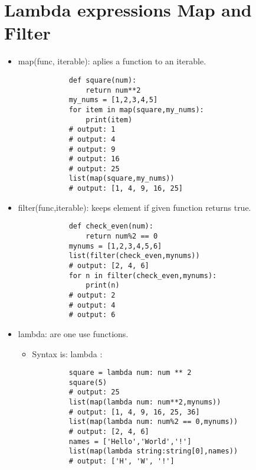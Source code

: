 \section{Lambda expressions Map and Filter}
\begin{itemize}
    \item map(func, iterable): aplies a function to an iterable.
        \begin{verbatim}
            def square(num):
                return num**2
            my_nums = [1,2,3,4,5]
            for item in map(square,my_nums):
                print(item)
            # output: 1
            # output: 4
            # output: 9
            # output: 16
            # output: 25
            list(map(square,my_nums))
            # output: [1, 4, 9, 16, 25]
        \end{verbatim}

    \item filter(func,iterable): keeps element if given function returns true.
        \begin{verbatim}
            def check_even(num):
                return num%2 == 0
            mynums = [1,2,3,4,5,6]
            list(filter(check_even,mynums))
            # output: [2, 4, 6]
            for n in filter(check_even,mynums):
                print(n)
            # output: 2
            # output: 4
            # output: 6
        \end{verbatim}

    \item lambda: are one use functions. 
        \begin{itemize}
            \item Syntax is: lambda :    
        \end{itemize}
        \begin{verbatim}
            square = lambda num: num ** 2
            square(5)
            # output: 25
            list(map(lambda num: num**2,mynums))
            # output: [1, 4, 9, 16, 25, 36]
            list(map(lambda num: num%2 == 0,mynums))
            # output: [2, 4, 6]
            names = ['Hello','World','!']
            list(map(lambda string:string[0],names))
            # output: ['H', 'W', '!']
        \end{verbatim}
\end{itemize}



